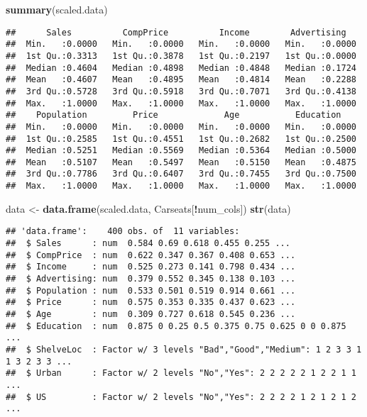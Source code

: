 \documentclass[
]{article}
\newenvironment{Shaded}{\begin{snugshade}}{\end{snugshade}}
\newcommand{\KeywordTok}[1]{\textcolor[rgb]{0.13,0.29,0.53}{\textbf{#1}}}
\newcommand{\NormalTok}[1]{#1}
\newcommand{\OperatorTok}[1]{\textcolor[rgb]{0.81,0.36,0.00}{\textbf{#1}}}
\newcommand{\StringTok}[1]{\textcolor[rgb]{0.31,0.60,0.02}{#1}}
\begin{document}
\begin{Shaded}
\begin{Highlighting}[]
\KeywordTok{summary}\NormalTok{(scaled.data)}
\end{Highlighting}
\end{Shaded}

\begin{verbatim}
##      Sales          CompPrice          Income        Advertising    
##  Min.   :0.0000   Min.   :0.0000   Min.   :0.0000   Min.   :0.0000  
##  1st Qu.:0.3313   1st Qu.:0.3878   1st Qu.:0.2197   1st Qu.:0.0000  
##  Median :0.4604   Median :0.4898   Median :0.4848   Median :0.1724  
##  Mean   :0.4607   Mean   :0.4895   Mean   :0.4814   Mean   :0.2288  
##  3rd Qu.:0.5728   3rd Qu.:0.5918   3rd Qu.:0.7071   3rd Qu.:0.4138  
##  Max.   :1.0000   Max.   :1.0000   Max.   :1.0000   Max.   :1.0000  
##    Population         Price             Age           Education     
##  Min.   :0.0000   Min.   :0.0000   Min.   :0.0000   Min.   :0.0000  
##  1st Qu.:0.2585   1st Qu.:0.4551   1st Qu.:0.2682   1st Qu.:0.2500  
##  Median :0.5251   Median :0.5569   Median :0.5364   Median :0.5000  
##  Mean   :0.5107   Mean   :0.5497   Mean   :0.5150   Mean   :0.4875  
##  3rd Qu.:0.7786   3rd Qu.:0.6407   3rd Qu.:0.7455   3rd Qu.:0.7500  
##  Max.   :1.0000   Max.   :1.0000   Max.   :1.0000   Max.   :1.0000
\end{verbatim}

\begin{Shaded}
\begin{Highlighting}[]
\NormalTok{data <-}\StringTok{ }\KeywordTok{data.frame}\NormalTok{(scaled.data, Carseats[}\OperatorTok{!}\NormalTok{num_cols])}
\KeywordTok{str}\NormalTok{(data)}
\end{Highlighting}
\end{Shaded}

\begin{verbatim}
## 'data.frame':    400 obs. of  11 variables:
##  $ Sales      : num  0.584 0.69 0.618 0.455 0.255 ...
##  $ CompPrice  : num  0.622 0.347 0.367 0.408 0.653 ...
##  $ Income     : num  0.525 0.273 0.141 0.798 0.434 ...
##  $ Advertising: num  0.379 0.552 0.345 0.138 0.103 ...
##  $ Population : num  0.533 0.501 0.519 0.914 0.661 ...
##  $ Price      : num  0.575 0.353 0.335 0.437 0.623 ...
##  $ Age        : num  0.309 0.727 0.618 0.545 0.236 ...
##  $ Education  : num  0.875 0 0.25 0.5 0.375 0.75 0.625 0 0 0.875 ...
##  $ ShelveLoc  : Factor w/ 3 levels "Bad","Good","Medium": 1 2 3 3 1 1 3 2 3 3 ...
##  $ Urban      : Factor w/ 2 levels "No","Yes": 2 2 2 2 2 1 2 2 1 1 ...
##  $ US         : Factor w/ 2 levels "No","Yes": 2 2 2 2 1 2 1 2 1 2 ...
\end{verbatim}
\end{document}
